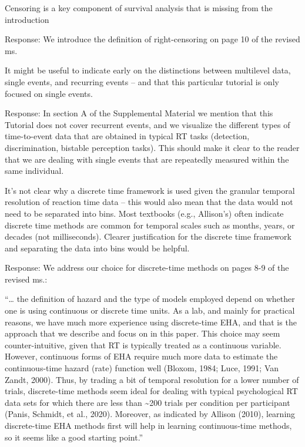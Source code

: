 \documentclass[
]{article}
\renewenvironment{quote}{\begin{leftbar}}{\end{leftbar}}
\begin{document}
\begin{quote}
Censoring is a key component of survival analysis that is missing from
the introduction
\end{quote}

Response: We introduce the definition of right-censoring on page 10 of
the revised ms.

\begin{quote}
It might be useful to indicate early on the distinctions between
multilevel data, single events, and recurring events -- and that this
particular tutorial is only focused on single events.
\end{quote}

Response: In section A of the Supplemental Material we mention that this
Tutorial does not cover recurrent events, and we visualize the different
types of time-to-event data that are obtained in typical RT tasks
(detection, discrimination, bistable perception tasks). This should make
it clear to the reader that we are dealing with single events that are
repeatedly measured within the same individual.

\begin{quote}
It's not clear why a discrete time framework is used given the granular
temporal resolution of reaction time data -- this would also mean that
the data would not need to be separated into bins. Most textbooks (e.g.,
Allison's) often indicate discrete time methods are common for temporal
scales such as months, years, or decades (not milliseconds). Clearer
justification for the discrete time framework and separating the data
into bins would be helpful.
\end{quote}

Response: We address our choice for discrete-time methods on pages 8-9
of the revised ms.:

``\ldots{} the definition of hazard and the type of models employed
depend on whether one is using continuous or discrete time units. As a
lab, and mainly for practical reasons, we have much more experience
using discrete-time EHA, and that is the approach that we describe and
focus on in this paper. This choice may seem counter-intuitive, given
that RT is typically treated as a continuous variable. However,
continuous forms of EHA require much more data to estimate the
continuous-time hazard (rate) function well (Bloxom, 1984; Luce, 1991;
Van Zandt, 2000). Thus, by trading a bit of temporal resolution for a
lower number of trials, discrete-time methods seem ideal for dealing
with typical psychological RT data sets for which there are less than
\textasciitilde200 trials per condition per participant (Panis, Schmidt,
et al., 2020). Moreover, as indicated by Allison (2010), learning
discrete-time EHA methods first will help in learning continuous-time
methods, so it seems like a good starting point.''
\end{document}
